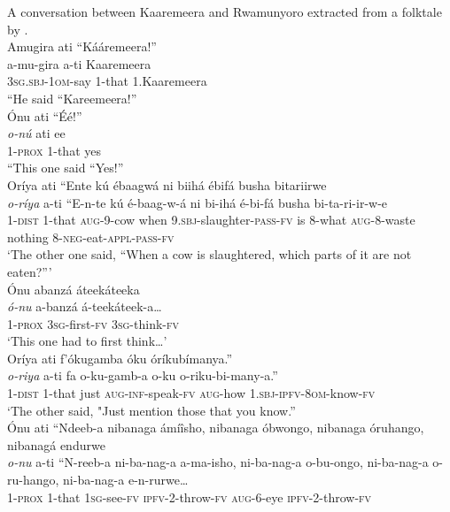 \documentclass[output=paper 		  ]{langscibook}
\begin{document}
\ex%
    \label{ex:asiimwe:52}
    A conversation between Kaaremeera and Rwamunyoro extracted from a folktale by   \citet[56--57]{Mubangizi1966}.\\
  Amugira ati “Kááremeera!”\\
 \gll a-mu-gira  a-ti  Kaaremeera\\
  3\textsc{sg.sbj}{}-1\textsc{om}{}-say  1-that  1.Kaaremeera\\
  \glt “He said “Kareemeera!”\\
 Ónu ati “Éé!”\\
\gll \emph{o-nú}  ati  ee\\
1-\textsc{prox}  \textsc{1-}that  yes\\
  \glt “This one said “Yes!”\\
  Oríya ati “Ente kú ébaagwá ni biihá ébifá busha bitariirwe\\
\gll  \emph{o-ríya}  a-ti  “E-n-te  kú  é-baag-w-á  ni  bi-ihá  é-bi-fá busha  bi-ta-ri-ir-w-e\\
  1-\textsc{dist}  1-that  \textsc{aug}{}-9-cow  when  9.\textsc{sbj-}slaughter-\textsc{pass-fv}  is  8-what  \textsc{aug}-8-waste
  nothing  8-\textsc{neg}{}-eat-\textsc{appl}{}-\textsc{pass-fv}\\
\glt  ‘The other one said, ``When a cow is slaughtered, which parts of it are not eaten?''’\\
  Ónu abanzá áteekáteeka\\
\gll  \emph{ó-nu}  a-banzá  á-teekáteek-a…\\
  1-\textsc{prox}  \textsc{3sg}{}-first-\textsc{fv}  3\textsc{sg}{}-think-\textsc{fv}\\
\glt  ‘This one had to first think…’\\
  Oríya ati f’ókugamba óku óríkubímanya.”\\
\gll  \emph{o-riya}  a-ti  fa  o-ku-gamb-a  o-ku  o-riku-bi-many-a.”\\
  1-\textsc{dist}  1-that  just  \textsc{aug-inf}{}-speak-\textsc{fv}  \textsc{aug}{}-how  \textsc{1.sbj-ipfv}{}-\textsc{8om-}know-\textsc{fv}\\
\glt  ‘The other said, "Just mention those that you know.”\\
Ónu ati “Ndeeb-a nibanaga ámíîsho, nibanaga óbwongo, nibanaga óruhango, nibanagá endurwe\\
\gll  \emph{o-nu}  a-ti  “N-reeb-a  ni-ba-nag-a  a-ma-isho,  ni-ba-nag-a o-bu-ongo,  ni-ba-nag-a  o-ru-hango,  ni-ba-nag-a  e-n-rurwe…\\
  1-\textsc{prox}  1-that  1\textsc{sg}{}-see-\textsc{fv}  \textsc{ipfv}{}-2-throw-\textsc{fv}  \textsc{aug}{}-6-eye  \textsc{ipfv}{}-2-throw-\textsc{fv}
\end{document}
